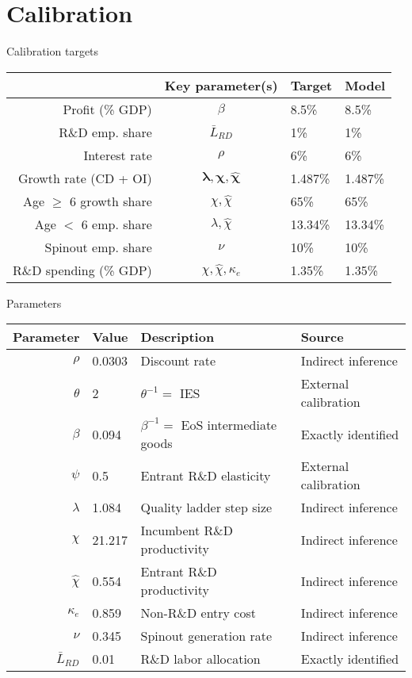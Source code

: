 \documentclass[english,usenames,dvipsnames]{beamer}
\begin{document}
\section{Calibration}


\begin{frame}
\tableofcontents[currentsection]
\end{frame}

\begin{frame}{Calibration targets}\label{calibration_targets}
\begin{table}[]
	\centering
	\label{calibration_targets}
	\small
	\begin{tabular}{rcll}
		\toprule \toprule
		& Key parameter(s) & Target & Model \tabularnewline
		\midrule
		Profit (\% GDP) & $\beta$ & 8.5\% & 8.5\% 
		\tabularnewline
		R\&D emp. share & $\bar{L}_{RD}$ & 1\% & 1\% 
		\tabularnewline
		Interest rate & $\rho$ & 6\% & 6\% 
		\tabularnewline
		Growth rate (CD + OI) & $\mathbf{\lambda, \chi, \hat{\chi}}$ & 1.487\% & 1.487\%
		\tabularnewline		
		Age $\ge$ 6 growth share & $\chi, \hat{\chi}$  & 65\% & 65\%
		\tabularnewline
		Age $<$ 6 emp. share  & $\lambda, \hat{\chi}$ & 13.34\% & 13.34\%
		\tabularnewline
		Spinout emp. share &$\nu$  & 10\% & 10\%
		\tabularnewline
		R\&D spending (\% GDP) & $\chi, \hat{\chi}, \kappa_e$  & 1.35\% & 1.35\%
		\tabularnewline
		\bottomrule
	\end{tabular}
\end{table}
	\hyperlink{economic_magnitude}{} 
\end{frame}


\begin{frame}{Parameters}\label{parameters}
\begin{table}[]
	\footnotesize
	\centering
	\label{calibration_parameters}
	\begin{tabular}{rlll}
		\toprule \toprule
		Parameter & Value & Description & Source \tabularnewline
		\midrule
		$\rho$ & 0.0303 & Discount rate  & Indirect inference \tabularnewline
		$\theta$ & 2 & $\theta^{-1} = $ IES & External calibration 
		\tabularnewline
		$\beta$ & 0.094 & $\beta^{-1} = $ EoS intermediate goods & Exactly identified \tabularnewline 
		$\psi$ & 0.5 & Entrant R\&D elasticity & External calibration \tabularnewline
		$\lambda$ & 1.084 & Quality ladder step size & Indirect inference 
		\tabularnewline
		$\chi$ & 21.217 & Incumbent R\&D productivity & Indirect inference 
		\tabularnewline
		$\hat{\chi}$ & 0.554 & Entrant R\&D productivity & Indirect inference \tabularnewline 
		$\kappa_e$ & 0.859 & Non-R\&D entry cost & Indirect inference \tabularnewline
		$\nu$ & 0.345 & Spinout generation rate  & Indirect inference\tabularnewline
		$\bar{L}_{RD}$ & 0.01 & R\&D labor allocation  & Exactly identified \tabularnewline
		\bottomrule
	\end{tabular}
\end{table}
\end{frame}
\end{document}
